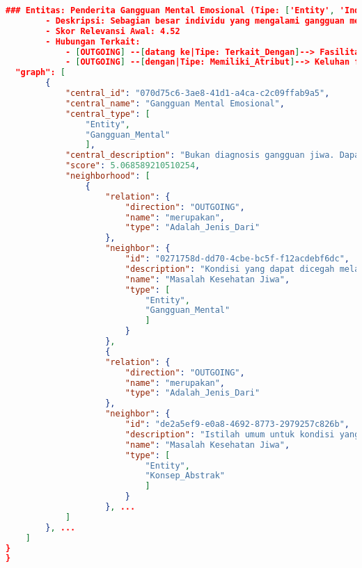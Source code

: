 \begin{lstlisting}[numbers=none, language=json]
		### Entitas: Penderita Gangguan Mental Emosional (Tipe: ['Entity', 'Individu'])
		- Deskripsi: Sebagian besar individu yang mengalami gangguan mental emosional, sering datang ke fasilitas pelayanan kesehatan dengan keluhan fisik dan tidak terdeteksi.
		- Skor Relevansi Awal: 4.52
		- Hubungan Terkait:
			- [OUTGOING] --[datang ke|Tipe: Terkait_Dengan]--> Fasilitas pelayanan kesehatan (Tipe: ['Entity', 'Penyedia_Layanan'] | Deskripsi: "Tempat penderita gangguan mental emosional sering datang dengan keluhan-keluhan fisik sehingga tidak terdeteksi.")
			- [OUTGOING] --[dengan|Tipe: Memiliki_Atribut]--> Keluhan fisik (Tipe: ['Entity', 'Gejala'] | Deskripsi: "Jenis keluhan yang sering dibawa penderita gangguan mental emosional ke fasilitas pelayanan kesehatan, menyebabkan ketidakdeteksian kondisi.")"
  "graph": [
		{
			"central_id": "070d75c6-3ae8-41d1-a4ca-c2c09ffab9a5",
			"central_name": "Gangguan Mental Emosional",
			"central_type": [
				"Entity",
				"Gangguan_Mental"
				],
			"central_description": "Bukan diagnosis gangguan jiwa. Dapat memengaruhi aktifitas sehari-hari yang berdampak pada menurunnya produktifitas dan kualitas hidup. Kondisi atau gangguan yang menjadi subjek utama dari 'Petunjuk Teknis Pencegahan dan Pengendalian Gangguan Mental Emosional'. Masalah kesehatan jiwa yang banyak dijumpai di Indonesia, diperkirakan diderita oleh 19 juta orang. Masalah kesehatan jiwa yang banyak terjadi di masyarakat. Suatu kondisi yang mengindikasikan seseorang mengalami perubahan psikologis yang mungkin merupakan sebuah kondisi normal, tetapi dapat juga merupakan kondisi patologis.",
			"score": 5.068589210510254,
			"neighborhood": [
				{
					"relation": {
						"direction": "OUTGOING",
						"name": "merupakan",
						"type": "Adalah_Jenis_Dari"
					},
					"neighbor": {
						"id": "0271758d-dd70-4cbe-bc5f-f12acdebf6dc",
						"description": "Kondisi yang dapat dicegah melalui upaya promotif dan preventif.",
						"name": "Masalah Kesehatan Jiwa",
						"type": [
							"Entity",
							"Gangguan_Mental"
							]
						}
					},
					{
					"relation": {
						"direction": "OUTGOING",
						"name": "merupakan",
						"type": "Adalah_Jenis_Dari"
					},
					"neighbor": {
						"id": "de2a5ef9-e0a8-4692-8773-2979257c826b",
						"description": "Istilah umum untuk kondisi yang mencakup tekanan emosional atau gangguan mental emosional. Kondisi kesehatan jiwa umum yang mencakup gangguan mental emosional.",
						"name": "Masalah Kesehatan Jiwa",
						"type": [
							"Entity",
							"Konsep_Abstrak"
							]
						}
					}, ...
			]
		}, ...
	]
}
}
\end{lstlisting}

